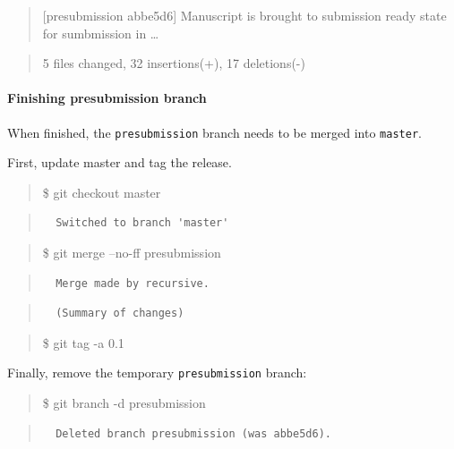 \documentclass[]{book}
\let\oldparagraph\paragraph
\renewcommand{\paragraph}[1]{\oldparagraph{#1}\mbox{}}
\begin{document}
\begin{quote}
{[}presubmission abbe5d6{]} Manuscript is brought to submission ready
state for sumbmission in \ldots{}
\end{quote}

\begin{quote}
5 files changed, 32 insertions(+), 17 deletions(-)
\end{quote}

\paragraph{Finishing presubmission
branch}\label{finishing-presubmission-branch}

When finished, the \texttt{presubmission} branch needs to be merged into
\texttt{master}.

First, update master and tag the release.

\begin{quote}
\$ git checkout master
\end{quote}

\begin{quote}
\begin{verbatim}
  Switched to branch 'master'
\end{verbatim}
\end{quote}

\begin{quote}
\$ git merge --no-ff presubmission
\end{quote}

\begin{quote}
\begin{verbatim}
  Merge made by recursive.
\end{verbatim}
\end{quote}

\begin{quote}
\begin{verbatim}
  (Summary of changes)
\end{verbatim}
\end{quote}

\begin{quote}
\$ git tag -a 0.1
\end{quote}

Finally, remove the temporary \texttt{presubmission} branch:

\begin{quote}
\$ git branch -d presubmission
\end{quote}

\begin{quote}
\begin{verbatim}
  Deleted branch presubmission (was abbe5d6).
\end{verbatim}
\end{quote}
\end{document}
